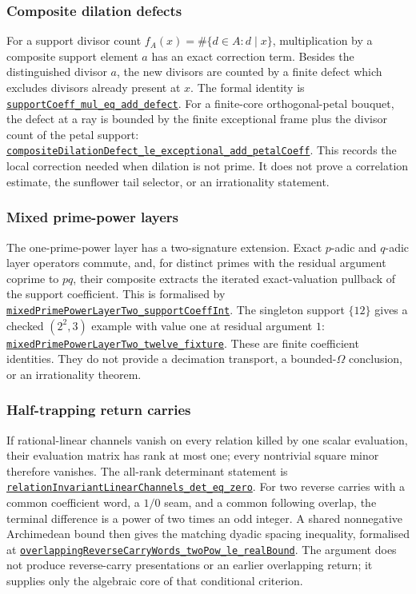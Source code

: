 \documentclass[11pt]{article}
\newcommand{\commit}{81150c1c6fdd4cd51e76d3aa0de344341e0e9e7c}
\newcommand{\repobase}{https://github.com/wcook04/plectis-lean-erdos249-257/blob/\commit}
\newcommand{\PK}{Erdos249257}
\newcommand{\lref}[3]{\href{\repobase/\PK/#1\#L#2}{\nolinkurl{#3}}}
\newcommand{\lrefx}[3]{\href{\repobase/\PK/#1\#L#2}{\nolinkurl{#3}}}
\theoremstyle{definition}
\theoremstyle{remark}
\begin{document}
\subsubsection{Composite dilation defects}\label{res:compositedefect}

For a support divisor count $f_A(x)=\#\{d\in A:d\mid x\}$, multiplication by
a composite support element $a$ has an exact correction term.  Besides the
distinguished divisor $a$, the new divisors are counted by a finite defect
which excludes divisors already present at $x$.  The formal identity is
\lref{CompositeDilationDefect.lean}{30}{supportCoeff_mul_eq_add_defect}.
For a finite-core orthogonal-petal bouquet, the defect at a ray is bounded by
the finite exceptional frame plus the divisor count of the petal support:
\lrefx{CompositeDilationDefect.lean}{151}{compositeDilationDefect_le_exceptional_add_petalCoeff}.
This records the local correction needed when dilation is not prime.  It does
not prove a correlation estimate, the sunflower tail selector, or an
irrationality statement.

\subsubsection{Mixed prime-power layers}\label{res:mixedlayer}

The one-prime-power layer has a two-signature extension.  Exact $p$-adic and
$q$-adic layer operators commute, and, for distinct primes with the residual
argument coprime to $pq$, their composite extracts the iterated exact-valuation
pullback of the support coefficient.  This is formalised by
\lref{MaximalOmegaLayer.lean}{39}{mixedPrimePowerLayerTwo_supportCoeffInt}.
The singleton support $\{12\}$ gives a checked $(2^2,3)$ example with value
one at residual argument $1$:
\lrefx{MaximalOmegaLayer.lean}{65}{mixedPrimePowerLayerTwo_twelve_fixture}.
These are finite coefficient identities.  They do not provide a decimation
transport, a bounded-$\Omega$ conclusion, or an irrationality theorem.

\subsubsection{Half-trapping return carries}\label{res:halftrapping}

If rational-linear channels vanish on every relation killed by one scalar
evaluation, their evaluation matrix has rank at most one; every nontrivial
square minor therefore vanishes.  The all-rank determinant statement is
\lref{HalfTrappingReturnCarry.lean}{42}{relationInvariantLinearChannels_det_eq_zero}.
For two reverse carries with a common coefficient word, a $1/0$ seam, and a
common following overlap, the terminal difference is a power of two times an
odd integer.  A shared nonnegative Archimedean bound then gives the matching
dyadic spacing inequality, formalised at
\lrefx{HalfTrappingReturnCarry.lean}{191}{overlappingReverseCarryWords_twoPow_le_realBound}.
The argument does not produce reverse-carry presentations or an earlier
overlapping return; it supplies only the algebraic core of that conditional
criterion.
\end{document}
